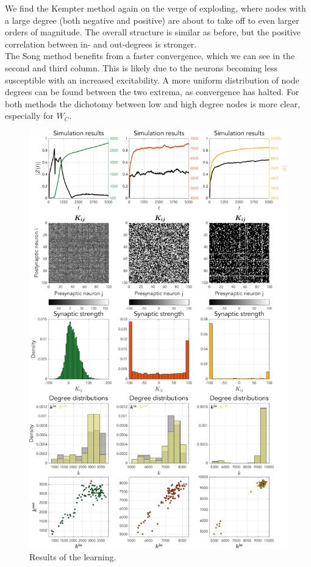 We find the Kempter method again on the verge of exploding, where nodes with a large degree (both negative and positive) are about to take off to even larger orders of magnitude. The overall structure is similar as before, but the positive correlation between in- and out-degrees is stronger.\\

The Song method benefits from a faster convergence, which we can see in the second and third column. This is likely due to the neurons becoming less susceptible with an increased excitability. A more uniform distribution of node degrees can be found between the two extrema, as convergence has halted. For both methods the dichotomy between low and high degree nodes is more clear, especially for $W_C$.


\newpage
\begin{figure}[H]
\centering
\includegraphics[height = \textheight]{../Figures/Learning/STDP.pdf}
\caption{Results of the \STDP learning.}
\label{fig:STDP}
\end{figure}

